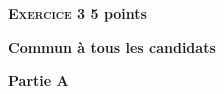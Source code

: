 \documentclass[11pt,a4paper,answers,fancyhdr]{exam}
\begin{document}
\vspace{0,5cm}
\newpage
\label{exercice 3}
\textbf{\textsc{Exercice 3} \hfill 5 points}
 
\textbf{Commun  à tous les candidats}

\medskip

%
%
%
%
%
%
%

\textbf{Partie A}

\medskip

%
%
%
\end{document}
